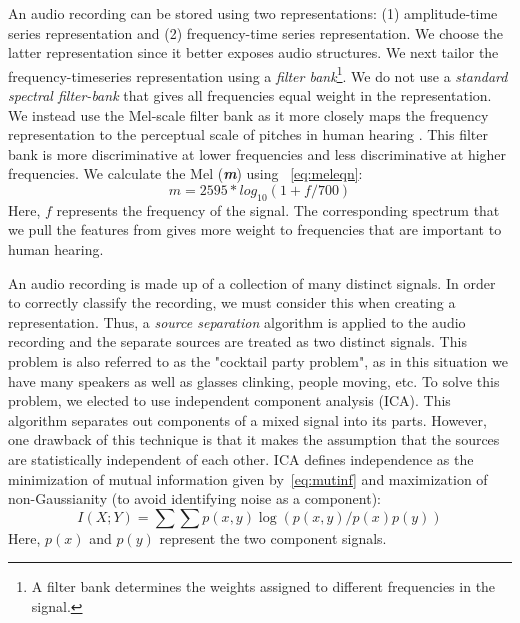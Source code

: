 %
An audio recording can be stored using two representations: (1) amplitude-time
series representation and (2) frequency-time series representation.
%
We choose the latter representation since it better exposes audio structures.
%
We next tailor the frequency-timeseries representation using a \textit{filter
bank}\footnote{A filter bank determines the weights assigned to different
frequencies in the signal.}.
%
We do not use a \textit{standard spectral filter-bank} that gives all
frequencies equal weight in the representation.
%
We instead use the Mel-scale filter bank as it more closely maps the frequency
representation to the perceptual scale of pitches in human hearing \cite{stevens_scale_1937}.
%
This filter bank is more discriminative at lower frequencies and 
less discriminative at higher frequencies.
%
We calculate the Mel (\textbf{\textit{m}}) using ~\cref{eq:meleqn}:
\begin{equation} \label{eq:meleqn}
    \textit{m} = 2595 * log_{10}(1+\textit{f}/700)
\end{equation}
%
Here, $f$ represents the frequency of the signal.
%
The corresponding spectrum that we pull the features from gives more weight to
frequencies that are important to human hearing.

%
An audio recording is made up of a collection of many distinct signals.
%
In order to correctly classify the recording, we must consider this when
creating a representation. 
%
Thus, a \textit{source separation} algorithm is applied to the audio recording
and the separate sources are treated as two distinct signals. 
%
This problem is also referred to as the "cocktail party problem", as in this
situation we have many speakers as well as glasses clinking, people moving, etc.
% 
To solve this problem, we elected to use independent component analysis (ICA).
%
This algorithm separates out components of a mixed signal into its parts.
%
However, one drawback of this technique is that it makes the assumption that 
the sources are statistically independent of each other. 
%
ICA defines independence as the minimization of mutual information given
by~\cref{eq:mutinf} and maximization of non-Gaussianity (to avoid identifying
noise as a component):
\begin{equation} \label{eq:mutinf}
    I(X;Y) = \sum\sum p(x,y)\log(p(x,y)/p(x)p(y))
\end{equation}
%
Here, $p(x)$ and $p(y)$ represent the two component signals.

